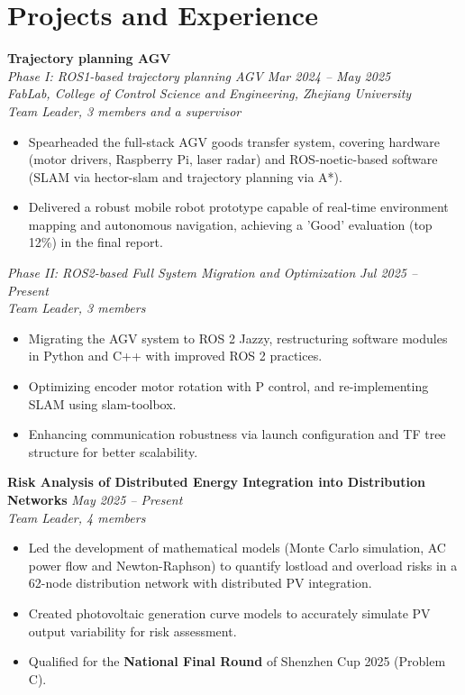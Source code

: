 \documentclass[a4paper,10pt]{article}
\begin{document}
\section*{Projects and Experience}
\textbf{Trajectory planning AGV} \\
\textit{Phase I: ROS1-based trajectory planning AGV} \hfill \textit{Mar 2024 -- May 2025} \\
\textit{FabLab, College of Control Science and Engineering, Zhejiang University} \\
\textit{Team Leader, 3 members and a supervisor} \\
\begin{itemize}
    \item Spearheaded the full-stack AGV goods transfer system, covering hardware (motor drivers, Raspberry Pi, laser radar) and ROS-noetic-based software (SLAM via hector-slam and trajectory planning via A*).
    \item Delivered a robust mobile robot prototype capable of real-time environment mapping and autonomous navigation, achieving a 'Good' evaluation (top 12\%) in the final report.
\end{itemize}
\textit{Phase II: ROS2-based Full System Migration and Optimization} \hfill \textit{Jul 2025 -- Present} \\
\textit{Team Leader, 3 members} \\
\begin{itemize}
    \item Migrating the AGV system to ROS 2 Jazzy, restructuring software modules in Python and C++ with improved ROS 2 practices.
    \item Optimizing encoder motor rotation with P control, and re-implementing SLAM using slam-toolbox.
    \item Enhancing communication robustness via launch configuration and TF tree structure for better scalability.
\end{itemize}

\noindent\textbf{Risk Analysis of Distributed Energy Integration into Distribution Networks} \hfill \textit{May 2025 -- Present} \\
\textit{Team Leader, 4 members} \\
\begin{itemize}
    \item Led the development of mathematical models (Monte Carlo simulation, AC power flow and Newton-Raphson) to quantify lostload and overload risks in a 62-node distribution network with distributed PV integration.
    \item Created photovoltaic generation curve models to accurately simulate PV output variability for risk assessment.
    \item Qualified for the \textbf{National Final Round} of Shenzhen Cup 2025 (Problem C).
\end{itemize}
\end{document}
